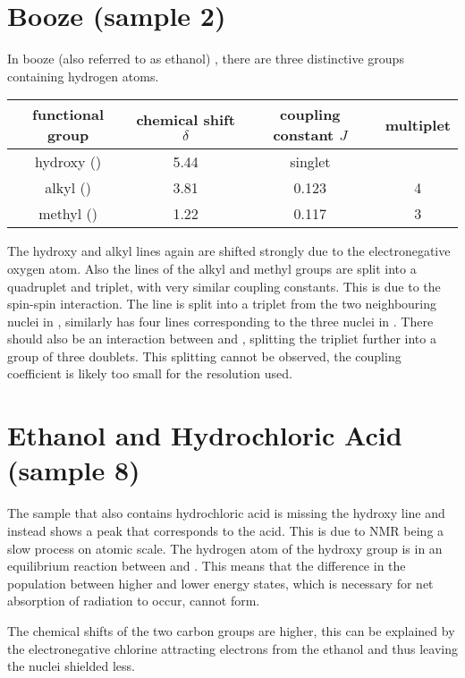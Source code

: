 \section{Booze (sample 2)}
In booze (also referred to as ethanol) , there are three distinctive groups containing hydrogen atoms.

\begin{center}
	\begin{tabular}{cSSc}
		\toprule
		functional group&	{chemical shift $\delta$}&	{coupling constant $J$}& multiplet\\
		\midrule
		hydroxy ()&	5.44& {singlet}\\
		alkyl ()&	3.81&	0.123&	4\\
		methyl ()&	1.22&	0.117&	3\\
		\bottomrule
	\end{tabular}
\end{center}

The hydroxy and alkyl lines again are shifted strongly due to the electronegative oxygen atom.
Also the lines of the alkyl and methyl groups are split into a quadruplet and triplet, with very similar coupling constants.
This is due to the spin-spin interaction.
The  line is split into a triplet from the two neighbouring nuclei in , similarly  has four lines corresponding to the three nuclei in .
There should also be an interaction between  and , splitting the  tripliet further into a group of three doublets.
This splitting cannot be observed, the coupling coefficient is likely too small for the resolution used.

\section{Ethanol and Hydrochloric Acid (sample 8)}

The sample that also contains hydrochloric acid is missing the hydroxy line and instead shows a peak that corresponds to the acid.
This is due to NMR being a slow process on atomic scale.
The hydrogen atom of the hydroxy group is in an equilibrium reaction between  and .
This means that the difference in the population between higher and lower energy states, which is necessary for net absorption of radiation to occur, cannot form.

The chemical shifts of the two carbon groups are higher, this can be explained by the electronegative chlorine attracting electrons from the ethanol and thus leaving the nuclei shielded less.

